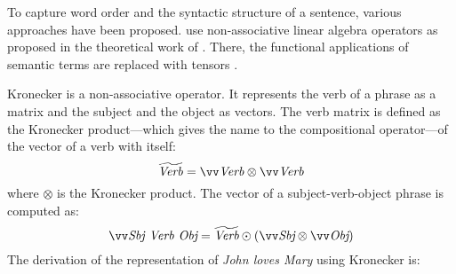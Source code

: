 To capture word order and the syntactic structure of a sentence, various approaches have been proposed.  use non-associative linear algebra operators as proposed in the theoretical work of . There, the functional applications of semantic terms are replaced with tensors \cite{Bourbaki1998commutative}.

Kronecker \cite{Grefenstette:2011:ETV:2140490.2140497} is a non-associative operator. It represents the verb of a phrase as a matrix and the subject and the object as vectors. The verb matrix is defined as the Kronecker product---which gives the name to the compositional operator---of the vector of a verb with itself:
%
\begin{equation*}
  \widetilde{\mathit{Verb}} = \ov{\mathit{Verb}} \otimes \ov{\mathit{Verb}}
\end{equation*}
%
where $\otimes$ is the Kronecker product. The vector of a subject-verb-object phrase is computed as:
%
\begin{equation*}
  \ov{\text{\it Sbj Verb Obj}} = \widetilde{\text{\it Verb}} \odot (\ov{\text{\it Sbj}} \otimes \ov{\text{\it Obj}})
\end{equation*}
%
The derivation of the representation of \textit{John loves Mary} using Kronecker is:
